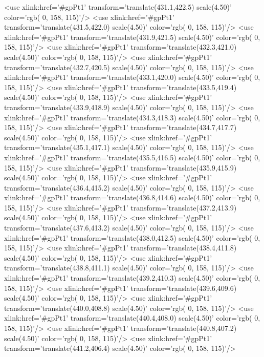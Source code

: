 	<use xlink:href='#gpPt1' transform='translate(431.1,422.5) scale(4.50)' color='rgb(  0, 158, 115)'/>
	<use xlink:href='#gpPt1' transform='translate(431.5,422.0) scale(4.50)' color='rgb(  0, 158, 115)'/>
	<use xlink:href='#gpPt1' transform='translate(431.9,421.5) scale(4.50)' color='rgb(  0, 158, 115)'/>
	<use xlink:href='#gpPt1' transform='translate(432.3,421.0) scale(4.50)' color='rgb(  0, 158, 115)'/>
	<use xlink:href='#gpPt1' transform='translate(432.7,420.5) scale(4.50)' color='rgb(  0, 158, 115)'/>
	<use xlink:href='#gpPt1' transform='translate(433.1,420.0) scale(4.50)' color='rgb(  0, 158, 115)'/>
	<use xlink:href='#gpPt1' transform='translate(433.5,419.4) scale(4.50)' color='rgb(  0, 158, 115)'/>
	<use xlink:href='#gpPt1' transform='translate(433.9,418.9) scale(4.50)' color='rgb(  0, 158, 115)'/>
	<use xlink:href='#gpPt1' transform='translate(434.3,418.3) scale(4.50)' color='rgb(  0, 158, 115)'/>
	<use xlink:href='#gpPt1' transform='translate(434.7,417.7) scale(4.50)' color='rgb(  0, 158, 115)'/>
	<use xlink:href='#gpPt1' transform='translate(435.1,417.1) scale(4.50)' color='rgb(  0, 158, 115)'/>
	<use xlink:href='#gpPt1' transform='translate(435.5,416.5) scale(4.50)' color='rgb(  0, 158, 115)'/>
	<use xlink:href='#gpPt1' transform='translate(435.9,415.9) scale(4.50)' color='rgb(  0, 158, 115)'/>
	<use xlink:href='#gpPt1' transform='translate(436.4,415.2) scale(4.50)' color='rgb(  0, 158, 115)'/>
	<use xlink:href='#gpPt1' transform='translate(436.8,414.6) scale(4.50)' color='rgb(  0, 158, 115)'/>
	<use xlink:href='#gpPt1' transform='translate(437.2,413.9) scale(4.50)' color='rgb(  0, 158, 115)'/>
	<use xlink:href='#gpPt1' transform='translate(437.6,413.2) scale(4.50)' color='rgb(  0, 158, 115)'/>
	<use xlink:href='#gpPt1' transform='translate(438.0,412.5) scale(4.50)' color='rgb(  0, 158, 115)'/>
	<use xlink:href='#gpPt1' transform='translate(438.4,411.8) scale(4.50)' color='rgb(  0, 158, 115)'/>
	<use xlink:href='#gpPt1' transform='translate(438.8,411.1) scale(4.50)' color='rgb(  0, 158, 115)'/>
	<use xlink:href='#gpPt1' transform='translate(439.2,410.3) scale(4.50)' color='rgb(  0, 158, 115)'/>
	<use xlink:href='#gpPt1' transform='translate(439.6,409.6) scale(4.50)' color='rgb(  0, 158, 115)'/>
	<use xlink:href='#gpPt1' transform='translate(440.0,408.8) scale(4.50)' color='rgb(  0, 158, 115)'/>
	<use xlink:href='#gpPt1' transform='translate(440.4,408.0) scale(4.50)' color='rgb(  0, 158, 115)'/>
	<use xlink:href='#gpPt1' transform='translate(440.8,407.2) scale(4.50)' color='rgb(  0, 158, 115)'/>
	<use xlink:href='#gpPt1' transform='translate(441.2,406.4) scale(4.50)' color='rgb(  0, 158, 115)'/>
